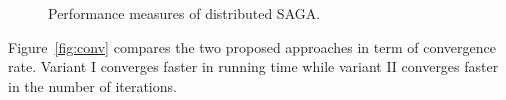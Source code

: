 \documentclass[a4paper,11pt]{article}
\newcommand{\figref}[1]{Figure~\ref{fig:#1}}
\begin{document}
\begin{figure}[ht]
	\centering
	\hspace{0pt}
	\hspace{0pt}
	\caption{Performance measures of distributed SAGA.}
	\label{fig:distributed_perf}
\end{figure}

\figref{conv} compares the two proposed approaches in term of convergence
rate. Variant I converges faster in running time while variant II converges
faster in the number of iterations.
\end{document}
